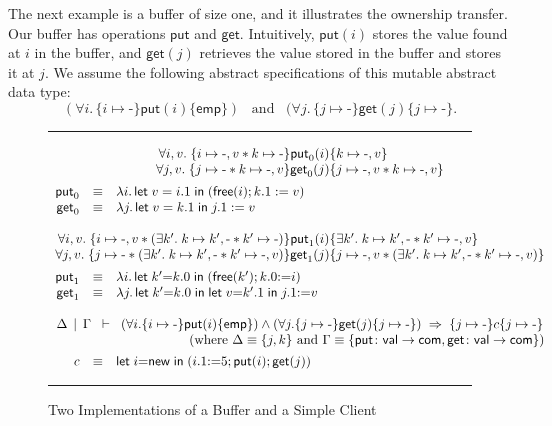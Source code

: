 \documentclass{LMCS}
\newcommand{\val}{\mathsf{val}}
\newcommand{\com}{\mathsf{com}}
\newcommand{\new}{\mathsf{new}}
\newcommand{\free}{\mathsf{free}}
\newcommand{\mletin}[2]{\mathsf{let}\;{#1}\;\mathsf{in}\;{#2}}
\newcommand{\blank}{\mbox{-}}
\newcommand{\emp}{\mathsf{emp}}
\newcommand{\pointsto}{\mapsto}
\newcommand{\mtri}[3]{\{{#1}\}{#2}\{{#3}\}}
\begin{document}
\newcommand{\putf}{\mathsf{put}}
\newcommand{\getf}{\mathsf{get}}

The next example is a buffer of
size one, and it illustrates the ownership
transfer. Our buffer has operations $\putf$ and $\getf$.
Intuitively, $\putf(i)$ stores the value found at $i$ in the buffer,
and $\getf(j)$ retrieves the value stored in the buffer and stores
it at $j$.
We assume the following abstract specifications of this mutable abstract
data type:
$$ 
(\forall i.\,\mtri{i\pointsto\blank}{\putf(i)}{\emp}) 
\;\;\;\mbox{and}\;\;\; 
(\forall j.\,\mtri{j\pointsto\blank}{\getf(j)}{j\pointsto\blank}.
$$

\begin{figure*}[t]
\hrule
$$
\begin{array}{rcl}
\multicolumn{3}{c}{
\begin{array}{@{}r@{}c@{}l@{}}
    \forall i,v.\;
    \{i\pointsto \blank,v * k\pointsto \blank\}
    & {\putf_0(i)} &
    \{k\pointsto \blank,v\} 
\\
    \forall j,v.\;
    \{j\pointsto \blank * k\pointsto \blank,v\} 
    & {\getf_0(j)} &
    \{j\pointsto \blank,v * k\pointsto \blank,v\}
\end{array}
}
\\[2.5ex]
    \putf_0 & \equiv & \lambda i.\, \mletin{v=i.1}{(\free(i);k.1 := v)}
\\
    \getf_0 & \equiv & \lambda j.\, \mletin{v=k.1}{j.1 := v}
\\
\\
\multicolumn{3}{c}{
\begin{array}{@{}r@{}c@{}l@{}}
  \forall i,v.\;
  \{i\pointsto \blank,v * (\exists k'.\;k\pointsto k',\blank * k'\pointsto \blank)\}
  & \putf_1(i) &
  \{\exists k'.\; k\pointsto k',\blank * k'\pointsto \blank,v \}
\\
  \forall j,v.\;
  \{j\pointsto \blank * (\exists k'.\;k\pointsto k',\blank * k'\pointsto \blank,v)\}
 & \getf_1(j) &
  \{j\pointsto \blank,v * (\exists k'.\;k\pointsto k',\blank * k'\pointsto \blank,v) \}
\end{array}
}
\\[2.5ex]
    \putf_1 & \equiv & 
      \lambda i.\, \mletin{k' {=} k.0}{(\free(k'); k.0 {:=} i)}  
\\
    \getf_1 & \equiv &
     \lambda j.\,
        \mletin{k' {=} k.0}{\mathsf{let}\; v {=} k'.1\;\mathsf{in}\; j.1 {:=} v}
\\
\\
\multicolumn{3}{c}{
     \Delta \,\mid\, \Gamma \;\;\vdash\;\; 
     (\forall i. \mtri{i\pointsto\blank}{\putf(i)}{\emp})\land
     (\forall j. \mtri{j\pointsto\blank}{\getf(j)}{j\pointsto\blank})
     \;\Rightarrow\; 
     \mtri{j\pointsto \blank}{c}{j\pointsto \blank}
}
\\
\multicolumn{3}{r}{
  \hfill(\mbox{where $\Delta \equiv \{j,k\}$ and
  $\Gamma \equiv \{\putf\colon \val \rightarrow \com, 
              \getf\colon \val \rightarrow \com\}$})
}
\\[1ex]
    c & \equiv &
  \mletin{i{=}\new}{(i.1{:=} 5; \putf(i); \getf(j))}
\end{array}
$$
\hrule
\caption{Two Implementations of a Buffer and a Simple Client}
\label{fig:impl}
\end{figure*}
\end{document}
